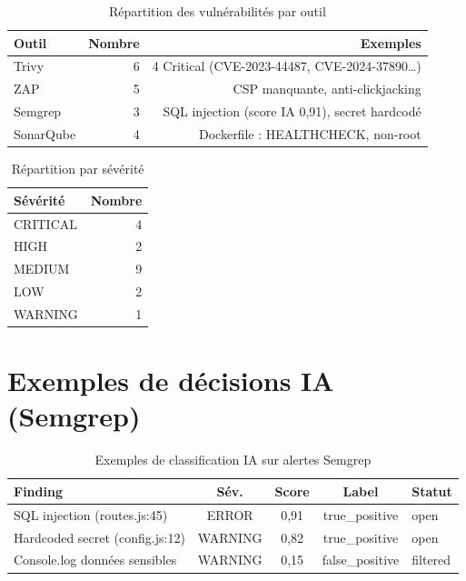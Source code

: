 \documentclass[12pt,a4paper]{report}
\begin{document}
\begin{table}[H]
\centering
\begin{tabular}{@{}lrr@{}}
\toprule
\textbf{Outil} & \textbf{Nombre} & \textbf{Exemples} \\
\midrule
Trivy & 6 & 4 Critical (CVE-2023-44487, CVE-2024-37890\ldots) \\
ZAP & 5 & CSP manquante, anti-clickjacking \\
Semgrep & 3 & SQL injection (score IA 0,91), secret hardcodé \\
SonarQube & 4 & Dockerfile : HEALTHCHECK, non-root \\
\bottomrule
\end{tabular}
\caption{Répartition des vulnérabilités par outil}
\label{tab:vulns}
\end{table}

\begin{table}[H]
\centering
\begin{tabular}{@{}lr@{}}
\toprule
\textbf{Sévérité} & \textbf{Nombre} \\
\midrule
CRITICAL & 4 \\
HIGH & 2 \\
MEDIUM & 9 \\
LOW & 2 \\
WARNING & 1 \\
\bottomrule
\end{tabular}
\caption{Répartition par sévérité}
\label{tab:severity}
\end{table}

\section{Exemples de décisions IA (Semgrep)}
\begin{table}[H]
\centering
\small
\begin{tabular}{@{}p{4.5cm}cccl@{}}
\toprule
\textbf{Finding} & \textbf{Sév.} & \textbf{Score} & \textbf{Label} & \textbf{Statut} \\
\midrule
SQL injection (routes.js:45) & ERROR & 0,91 & true\_positive & open \\
Hardcoded secret (config.js:12) & WARNING & 0,82 & true\_positive & open \\
Console.log données sensibles & WARNING & 0,15 & false\_positive & filtered \\
\bottomrule
\end{tabular}
\caption{Exemples de classification IA sur alertes Semgrep}
\label{tab:ai-examples}
\end{table}
\end{document}
